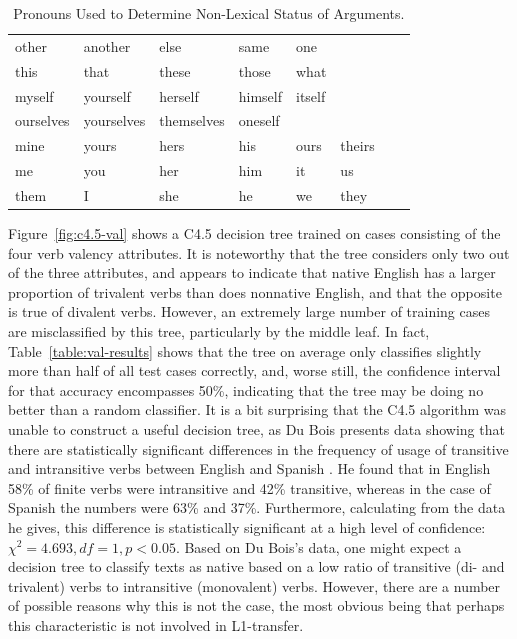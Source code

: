 \documentclass[main.tex]{subfiles}
\begin{document}
\begin{table}[ht]
\small
\centering
\caption{Pronouns Used to Determine Non-Lexical Status of Arguments.}
\begin{tabular}{ l l l l l l l l }
\toprule

other & another & else & same & one \\
this & that & these & those & what \\
myself & yourself & herself & himself & itself \\
ourselves & yourselves &themselves & oneself \\
mine & yours & hers & his & ours & theirs \\
me & you & her & him & it & us \\
them & I & she & he & we & they \\

\bottomrule
\end{tabular}
\label{table:pronouns}
\end{table}

Figure~\ref{fig:c4.5-val} shows a C4.5 decision tree trained on cases consisting of the four verb valency attributes. It is noteworthy that the tree considers only two out of the three attributes, and appears to indicate that native English has a larger proportion of trivalent verbs than does nonnative English, and that the opposite is true of divalent verbs. However, an extremely large number of training cases are misclassified by this tree, particularly by the middle leaf. In fact, Table~\ref{table:val-results} shows that the tree on average only classifies slightly more than half of all test cases correctly, and, worse still, the confidence interval for that accuracy encompasses 50\%, indicating that the tree may be doing no better than a random classifier. It is a bit surprising that the C4.5 algorithm was unable to construct a useful decision tree, as Du Bois presents data showing that there are statistically significant differences in the frequency of usage of transitive and intransitive verbs between English and Spanish \citep[Table~2.3]{dubois:2003}. He found that in English 58\% of finite verbs were intransitive and 42\% transitive, whereas in the case of Spanish the numbers were 63\% and 37\%. Furthermore, calculating from the data he gives, this difference is statistically significant at a high level of confidence: $\chi^2=4.693, df=1, p<0.05$. Based on Du Bois's data, one might expect a decision tree to classify texts as native based on a low ratio of transitive (di- and trivalent) verbs to intransitive (monovalent) verbs. However, there are a number of possible reasons why this is not the case, the most obvious being that perhaps this characteristic is not involved in L1-transfer.
\end{document}
